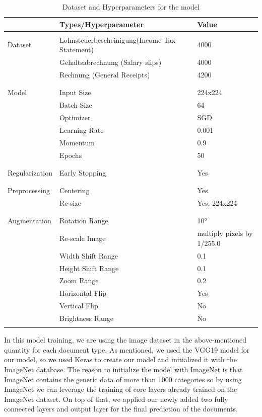 \begin{table}[H]
\centering
\begin{tabular}{l  l  l}
 & Types/Hyperparameter & Value \\
\hline
\\ Dataset & Lohnsteuerbescheinigung(Income Tax Statement) & 4000 \\
      & Gehaltsabrechnung (Salary slips) & 4000 \\
      & Rechnung (General Receipts) & 4200  \\\\
\hline
\\ Model & Input Size & 224x224 \\
      & Batch Size & 64 \\
      & Optimizer & SGD \\
      & Learning Rate & 0.001 \\
      & Momentum & 0.9 \\
      & Epochs & 50 \\\\
\hline
\\ Regularization & Early Stopping & Yes \\ \\
\hline
\\ Preprocessing & Centering & Yes \\ 
                 & Re-size   & Yes, 224x224 \\ \\
\hline
\\ Augmentation & Rotation Range & \ang{10}  \\ 
                & Re-scale Image & multiply pixels by 1/255.0 \\ 
                & Width Shift Range & 0.1 \\ 
                & Height Shift Range & 0.1 \\ 
                & Zoom Range & 0.2 \\ 
                & Horizontal Flip & Yes \\ 
                & Vertical Flip & No \\ 
                & Brightness Range & No \\ \\
\hline
\end{tabular}
\caption{Dataset and Hyperparameters for the model}
\label{hp_mdl_1}
\end{table}
\par
In this model training, we are using the image dataset in the above-mentioned quantity for each document type. As mentioned, we used the VGG19 model for our model, so we used Keras to create our model and initialized it with the ImageNet database. The reason to initialize the model with ImageNet is that ImageNet contains the generic data of more than 1000 categories so by using ImageNet we can leverage the training of core layers already trained on the ImageNet dataset. On top of that, we applied our newly added two fully connected layers and output layer for the final prediction of the documents.
